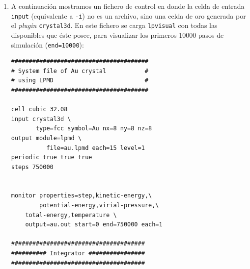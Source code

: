 \begin{enumerate}

Nuevamente, lo que precede a \verb+-i+ es propio del formato del archivo (formato \verb+xyz+ en este caso, lo que significa que debemos dar el tama\~no de celda con la opci\'on \verb+-L+). Al \verb+lpvisual+ le pasamos los \'angulos de visualizaci\'on en coordenadas polares, donde, en la notaci\'on habitual, \verb+azimuth+ es el \'angulo azimutal $\varphi$ y \verb+zenith+ es el \'angulo cenital $\theta$. En este caso, $\theta=90^o$ y $\varphi=45^o$, lo que significa que

\begin{align}
x&=\sin\theta\cos\varphi=\frac1{\sqrt2}\\
y&=\sin\theta\sin\varphi=\frac1{\sqrt2}\\
z&=\cos\theta=0
\end{align}

por lo tanto, la c\'amara se situar\'a en un vector proporcional al vector unitario $(x,y,z)=\frac{1}{\sqrt2}(1,1,0)$. La constante de proporcionalidad es el m\'odulo de la diagonal de la celda de simulaci\'on.

\item A continuaci\'on mostramos un fichero de control en donde la celda de entrada \verb+input+ (equivalente a \verb+-i+) no es un archivo, sino una celda de oro generada por el \emph{plugin} \verb+crystal3d+. En este fichero se carga \verb+lpvisual+ con todas las disponibles que \'este posee, para visualizar los primeros 10000 pasos de simulaci\'on (\verb+end=10000+):

\begin{multicols}{2}
\setlength{\columnseprule}{.5pt}
\begin{verbatim}
#######################################
# System file of Au crystal           #
# using LPMD                          #
#######################################

cell cubic 32.08
input crystal3d \
       type=fcc symbol=Au nx=8 ny=8 nz=8
output module=lpmd \
	      file=au.lpmd each=15 level=1
periodic true true true
steps 750000


monitor properties=step,kinetic-energy,\
        potential-energy,virial-pressure,\
	total-energy,temperature \
	output=au.out start=0 end=750000 each=1

######################################
########## Integrator ################
######################################


\end{verbatim}
\end{multicols}
\end{enumerate}
